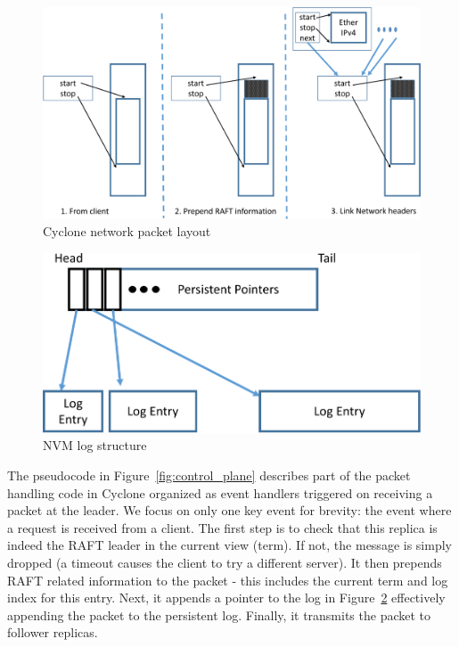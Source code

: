 \documentclass[twocolumn]{article}
\begin{document}
\begin{figure}
  \centering
  \includegraphics[scale=0.6]{figures2/network_packet.pdf}
  \caption{Cyclone network packet layout}
  \label{fig:packet_layout}
\end{figure}

\begin{figure}
\centering
\includegraphics[scale=0.5]{figures2/nvm_log.pdf}
\caption{NVM log structure}
\label{fig:nvm_log}
\end{figure}


The pseudocode in Figure~\ref{fig:control_plane} describes part of the packet
handling code in Cyclone organized as event handlers triggered on receiving a
packet at the leader. We focus on only one key event for brevity: the event
where a request is received from a client. The first step is to check that this
replica is indeed the RAFT leader in the current view (term). If not, the
message is simply dropped (a timeout causes the client to try a different
server). It then prepends RAFT related information to the packet - this includes
the current term and log index for this entry. Next, it appends a pointer to the
log in Figure~\ref{fig:nvm_log} effectively appending the packet to the
persistent log. Finally, it transmits the packet to follower replicas.
\end{document}
